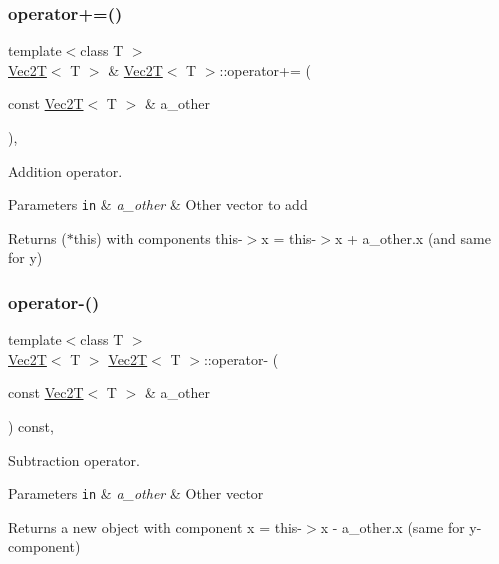 \subsubsection{\texorpdfstring{operator+=()}{operator+=()}}
{\footnotesize\ttfamily template$<$class T $>$ \\
\hyperlink{classVec2T}{Vec2T}$<$ T $>$ \& \hyperlink{classVec2T}{Vec2T}$<$ T $>$\+::operator+= (\begin{DoxyParamCaption}\item[{const \hyperlink{classVec2T}{Vec2T}$<$ T $>$ \&}]{a\+\_\+other }\end{DoxyParamCaption})\hspace{0.3cm}{\ttfamily [inline]}, {\ttfamily [noexcept]}}



Addition operator. 


\begin{DoxyParams}[1]{Parameters}
\mbox{\tt in}  & {\em a\+\_\+other} & Other vector to add\\
\hline
\end{DoxyParams}
Returns ($\ast$this) with components this-\/$>$x = this-\/$>$x + a\+\_\+other.\+x (and same for y) \mbox{\label{classVec2T_a788b057579c3c92068e15595d7781734}} 
\subsubsection{\texorpdfstring{operator-\/()}{operator-()}}
{\footnotesize\ttfamily template$<$class T $>$ \\
\hyperlink{classVec2T}{Vec2T}$<$ T $>$ \hyperlink{classVec2T}{Vec2T}$<$ T $>$\+::operator-\/ (\begin{DoxyParamCaption}\item[{const \hyperlink{classVec2T}{Vec2T}$<$ T $>$ \&}]{a\+\_\+other }\end{DoxyParamCaption}) const\hspace{0.3cm}{\ttfamily [inline]}, {\ttfamily [noexcept]}}



Subtraction operator. 


\begin{DoxyParams}[1]{Parameters}
\mbox{\tt in}  & {\em a\+\_\+other} & Other vector\\
\hline
\end{DoxyParams}
Returns a new object with component x = this-\/$>$x -\/ a\+\_\+other.\+x (same for y-\/component) \mbox{\label{classVec2T_a6c98f1e7b2bb5479e3616fbda7124313}} 
